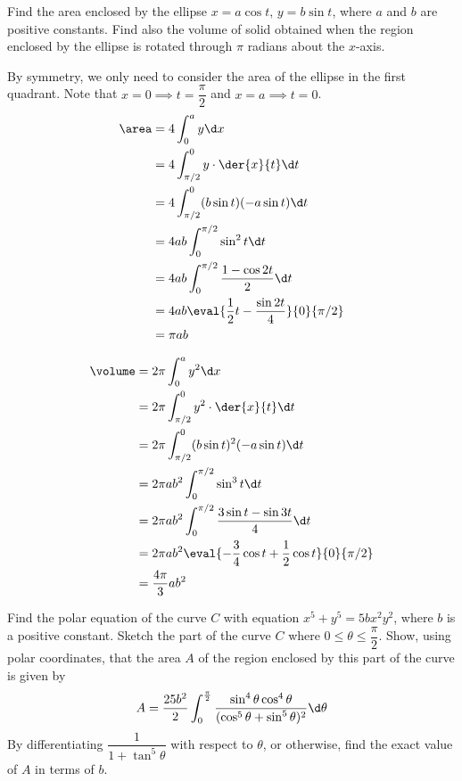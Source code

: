 \documentclass{jhwhw}
\begin{document}

    \problem{}
        Find the area enclosed by the ellipse $x = a \cos t, \, y = b \sin t$, where $a$ and $b$ are positive constants. Find also the volume of solid obtained when the region enclosed by the ellipse is rotated through $\pi$ radians about the $x$-axis.

    \solution
        By symmetry, we only need to consider the area of the ellipse in the first quadrant. Note that $x = 0 \implies t = \dfrac\pi2$ and $x = a \implies t = 0$.
        \begin{align*}
            \area &= 4\int_0^a y \d x\\
            &= 4\int_{\pi/2}^0 y \cdot \der{x}{t} \d t\\
            &= 4\int_{\pi/2}^0 (b\sin t)(-a\sin t) \d t\\
            &= 4ab\int_0^{\pi/2} \sin^2 t \d t\\
            &= 4ab\int_0^{\pi/2} \dfrac{1 - \cos 2t}2 \d t\\
            &= 4ab\eval{\dfrac{1}2 t - \dfrac{\sin 2t}4}{0}{\pi/2}\\
            &= \pi ab
        \end{align*}


        \begin{align*}
            \volume &= 2\pi \int_0^a y^2 \d x\\
            &= 2\pi\int_{\pi/2}^0 y^2 \cdot \der{x}{t} \d t\\
            &= 2\pi\int_{\pi/2}^0 (b\sin t)^2 (-a\sin t) \d t\\
            &= 2\pi a b^2 \int_0^{\pi/2} \sin^3 t \d t\\
            &= 2\pi a b^2 \int_0^{\pi/2} \dfrac{3\sin t - \sin 3t}{4} \d t\\
            &= 2\pi a b^2 \eval{-\dfrac34 \cos t + \dfrac12 \cos t}{0}{\pi/2}\\
            &= \dfrac{4\pi}3 ab^2
        \end{align*}


    \problem{}
        Find the polar equation of the curve $C$ with equation $x^5 + y^5 = 5bx^2y^2$, where $b$ is a positive constant. Sketch the part of the curve $C$ where $0 \leq \theta \leq \dfrac\pi2$. Show, using polar coordinates, that the area $A$ of the region enclosed by this part of the curve is given by
        \begin{equation*}
            A = \dfrac{25b^2}2 \int_0^{\frac\pi2} \dfrac{\sin^4\theta\cos^4\theta}{(\cos^5\theta + \sin^5\theta)^2} \d \theta
        \end{equation*}
        By differentiating $\dfrac1{1 + \tan^5\theta}$ with respect to $\theta$, or otherwise, find the exact value of $A$ in terms of $b$.
\end{document}
